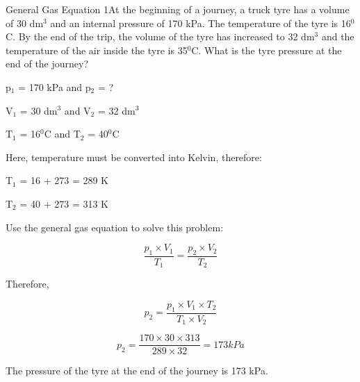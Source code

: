 \begin{wex}{General Gas Equation 1}{At the beginning of a journey, a truck tyre has a volume of 30 dm$^{3}$ and an internal pressure of 170 kPa. The temperature of the tyre is 16$^{0}$C. By the end of the trip, the volume of the tyre has increased to 32 dm$^{3}$ and the temperature of the air inside the tyre is 35$^{0}$C. What is the tyre pressure at the end of the journey?\\}

{

p$_{1}$ = 170 kPa and p$_{2}$ = ?

V$_{1}$ = 30 dm$^{3}$ and V$_{2}$ = 32 dm$^{3}$

T$_{1}$ = 16$^{0}$C and T$_{2}$ = 40$^{0}$C\\
}

{
Here, temperature must be converted into Kelvin, therefore:

T$_{1}$ = 16 + 273 = 289 K

T$_{2}$ = 40 + 273 = 313 K\\
}

{

Use the general gas equation to solve this problem:

\begin{equation*}
\frac{p_{1} \times V_{1}}{T_{1}} = \frac{p_{2} \times V_{2}}{T_{2}}
\end{equation*}

Therefore,

\begin{equation*}
p_{2} = \frac{p_{1} \times V_{1} \times T_{2}}{T_{1} \times V_{2}}
\end{equation*}
}

{

\begin{equation*}
p_{2} = \frac{170 \times 30 \times 313}{289 \times 32} = 173 kPa
\end{equation*}

The pressure of the tyre at the end of the journey is 173 kPa.
}
\end{wex}

